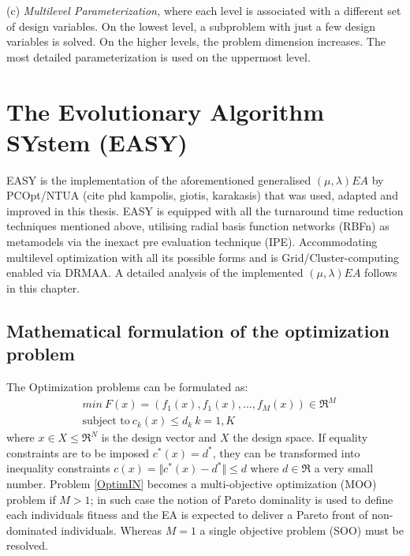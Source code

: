(c) \emph{Multilevel Parameterization,} where each level is
associated with a different set of design variables. On the lowest
level, a subproblem with just a few design variables is solved. On
the higher levels, the problem dimension increases. The most detailed parameterization is used on the uppermost level.



\section{The Evolutionary Algorithm SYstem (EASY)}
EASY is the implementation of the aforementioned generalised $(\mu,\lambda)EA$ by PCOpt/NTUA (cite phd kampolis, giotis, karakasis) that was used, adapted and improved in this thesis. EASY is equipped with all the turnaround time reduction techniques mentioned above, utilising radial basis function networks (RBFn) as metamodels via the inexact pre evaluation technique (IPE). Accommodating multilevel optimization with all its possible forms and is Grid/Cluster-computing enabled via DRMAA. A detailed analysis of the implemented $(\mu,\lambda)EA$ follows in this chapter.  

\subsection{Mathematical formulation of the optimization problem}
The Optimization problems can be formulated as:
\begin{align} 
   &min ~ F(x)=(f_1(x),f_1(x),...,f_M(x))\in \Re^{M} \nonumber \\
   &\mbox{subject to} ~ c_k(x)\leq d_k ~ k =1,K
\label{OptimIN}
\end{align}
where $x\in X \!\leq\! \Re^{N}$ is the design vector and $X$ the design space. If equality constraints are to be imposed $ c^*(x)=d^* $, they can be transformed into inequality constraints $ c(x)=\Vert c^*(x)-d^*\Vert \leq d $ where $ d \in \Re $ a very small number.  Problem \ref{OptimIN} becomes a multi-objective optimization (MOO) problem if $M \!> \!1$; in such case the notion of Pareto dominality \cite{Zitzler2000} is used to define each individuals fitness and the EA is expected to deliver a Pareto front of non-dominated individuals. Whereas $M = 1$ a single objective problem (SOO) must be resolved.   

